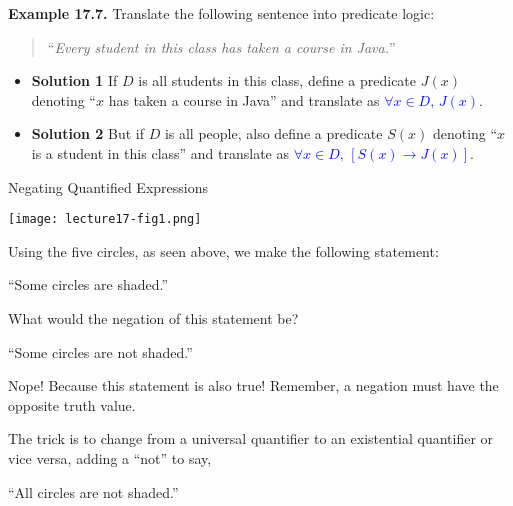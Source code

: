 \documentclass[aspectratio=169]{beamer}
\providecommand{\Blue}[1]{\textcolor{blue}{#1}}
\begin{document}
\begin{frame}[plain]{ }

 {\bf Example 17.7.} Translate the following sentence into
      predicate logic: 
        \begin{quote} 
         ``\emph{Every student in this class has taken
      a course in Java.}''\pause 
        \end{quote}
  
      \begin{itemize}
       \item {\bf Solution 1} If $D$ is all students in this class, define a
	predicate $J(x)$ denoting ``$x$ has taken a
	course in Java'' and translate as \Blue{$\forall x\in D,\, J(x)$}. \pause 
	\item {\bf Solution 2} But if $D$ is all people, also define a
	  predicate $S(x)$ denoting ``$x$ is a student in
         this class'' and translate as \Blue{$\forall x\in D,\, \left[ S(x)\rightarrow J(x)\right]$}.
  \end{itemize}
  
\vspace{.5in}

 
\end{frame}

\begin{frame}[plain]{Negating Quantified Expressions}
  
 \begin{center}
   \texttt{[image: lecture17-fig1.png]}
 \end{center}

Using the five circles, as seen above, we make the following statement:

\begin{center}
“Some circles are shaded.”
\end{center}
 
What would the negation of this statement be? \pause

 \begin{center}
“Some circles are not shaded.”
\end{center}
 
Nope! Because this statement is also true! 
Remember, a negation must have the opposite truth value.\pause
\medskip

The trick is to change from a universal quantifier to an existential quantifier 
or vice versa, adding a “not” to say, 
\begin{center}
“All circles are not shaded.”
\end{center}
 
\end{frame}
\end{document}
